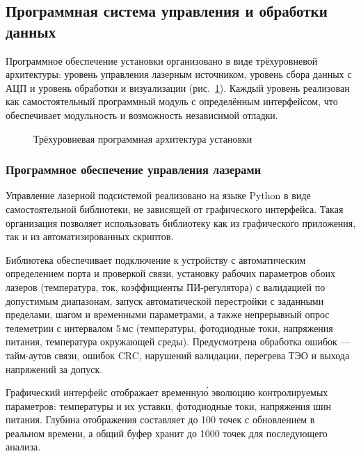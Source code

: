 \subsection{Программная система управления и обработки данных}

Программное обеспечение установки организовано в виде трёхуровневой
архитектуры: уровень управления лазерным источником, уровень сбора данных
с АЦП и уровень обработки и визуализации (рис.~\ref{fig:sw-architecture}).
Каждый уровень реализован как самостоятельный программный модуль с
определённым интерфейсом, что обеспечивает модульность и возможность
независимой отладки.

\begin{figure}[H]
    \centering
    \caption{Трёхуровневая программная архитектура установки}
    \label{fig:sw-architecture}
\end{figure}

\subsubsection{Программное обеспечение управления лазерами}

Управление лазерной подсистемой реализовано на языке Python в виде
самостоятельной библиотеки, не зависящей от графического интерфейса. Такая
организация позволяет использовать библиотеку как из графического приложения,
так и из автоматизированных скриптов.

Библиотека обеспечивает подключение к устройству с автоматическим определением
порта и проверкой связи, установку рабочих параметров обоих лазеров
(температура, ток, коэффициенты ПИ-регулятора) с валидацией по допустимым
диапазонам, запуск автоматической перестройки с заданными пределами, шагом и
временными параметрами, а также непрерывный опрос телеметрии с интервалом
5\,мс (температуры, фотодиодные токи, напряжения питания, температура
окружающей среды). Предусмотрена обработка ошибок --- тайм-аутов связи,
ошибок CRC, нарушений валидации, перегрева ТЭО и выхода напряжений за
допуск.

Графический интерфейс отображает временну\'{ю} эволюцию контролируемых
параметров: температуры и их уставки, фотодиодные токи, напряжения шин
питания. Глубина отображения составляет до 100 точек с обновлением в
реальном времени, а общий буфер хранит до 1000 точек для последующего
анализа.

